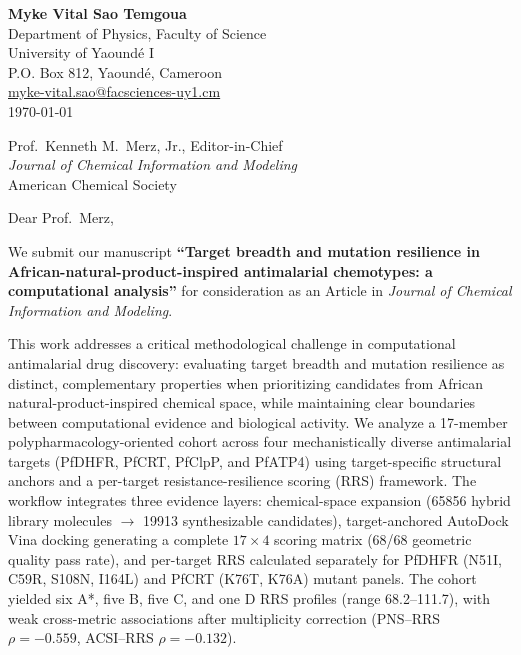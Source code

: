 \documentclass[10pt,letterpaper]{article}
\begin{document}
\begin{flushleft}
\textbf{Myke Vital Sao Temgoua} \\
Department of Physics, Faculty of Science \\
University of Yaound\'{e} I \\
P.O. Box 812, Yaound\'{e}, Cameroon \\
\href{mailto:myke-vital.sao@facsciences-uy1.cm}{myke-vital.sao@facsciences-uy1.cm} \\[0.8em]
\today
\end{flushleft}

\begin{flushleft}
Prof.\ Kenneth M.\ Merz, Jr., Editor-in-Chief \\
\textit{Journal of Chemical Information and Modeling} \\
American Chemical Society
\end{flushleft}

\vspace{0.2em}

\noindent Dear Prof.\ Merz,

We submit our manuscript \textbf{``Target breadth and mutation resilience in African-natural-product-inspired antimalarial chemotypes: a computational analysis''} for consideration as an Article in \textit{Journal of Chemical Information and Modeling}.

This work addresses a critical methodological challenge in computational antimalarial drug discovery: evaluating target breadth and mutation resilience as distinct, complementary properties when prioritizing candidates from African natural-product-inspired chemical space, while maintaining clear boundaries between computational evidence and biological activity. We analyze a 17-member polypharmacology-oriented cohort across four mechanistically diverse antimalarial targets (PfDHFR, PfCRT, PfClpP, and PfATP4) using target-specific structural anchors and a per-target resistance-resilience scoring (RRS) framework. The workflow integrates three evidence layers: chemical-space expansion (\num{65856} hybrid library molecules $\rightarrow$ \num{19913} synthesizable candidates), target-anchored AutoDock Vina docking generating a complete $\num{17}\times\num{4}$ scoring matrix (\num{68}/\num{68} geometric quality pass rate), and per-target RRS calculated separately for PfDHFR (N51I, C59R, S108N, I164L) and PfCRT (K76T, K76A) mutant panels. The cohort yielded six A*, five B, five C, and one D RRS profiles (range \numrange{68.2}{111.7}), with weak cross-metric associations after multiplicity correction (PNS--RRS $\rho=-\num{0.559}$, ACSI--RRS $\rho=-\num{0.132}$).
\end{document}
